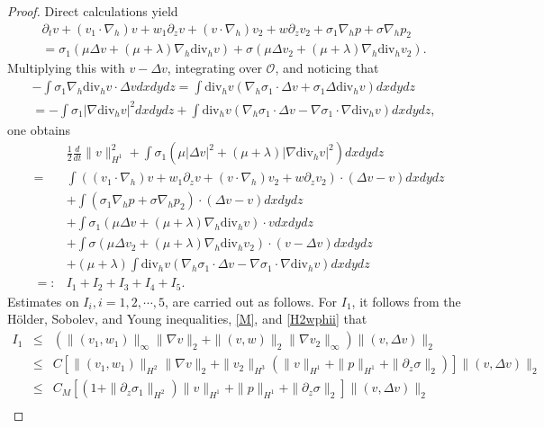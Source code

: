 \documentclass[12pt,reqno]{amsart}
\numberwithin{equation}{section}
\begin{document}
\begin{proof}
  Direct calculations yield
  \begin{align*}
    \partial_tv+(v_1\cdot\nabla_h)v+w_1\partial_zv+(v\cdot\nabla_h)v_2+w\partial_zv_2+\sigma_1\nabla_hp+\sigma\nabla_hp_2\\
    =\sigma_1(\mu\Delta v+(\mu+\lambda)\nabla_h\text{div}_hv)+\sigma(\mu\Delta v_2+(\mu+\lambda)\nabla_h\text{div}_hv_2).
  \end{align*}
  Multiplying this with $v-\Delta v$, integrating over $\mathcal O$, and noticing that
  \begin{eqnarray*}
    -\int\sigma_1\nabla_h\text{div}_hv\cdot\Delta vdxdydz
    =\int\text{div}_hv(\nabla_h\sigma_1\cdot\Delta v+\sigma_1\Delta\text{div}_hv)dxdydz\\
    =-\int\sigma_1|\nabla\text{div}_hv|^2dxdydz+\int\text{div}_hv(\nabla_h\sigma_1\cdot\Delta v-\nabla\sigma_1\cdot\nabla\text{div}_hv)
    dxdydz,
  \end{eqnarray*}
  one obtains
  \begin{eqnarray}
    &&\frac12\frac{d}{dt}\|v\|_{H^1}^2+\int\sigma_1(\mu|\Delta v|^2+(\mu+\lambda)|\nabla\text{div}_hv|^2)dxdydz\nonumber\\
    &=&\int((v_1\cdot\nabla_h)v+w_1\partial_zv+(v\cdot\nabla_h)v_2+w\partial_zv_2)\cdot(\Delta v-v)dxdydz\nonumber\\
    &&+\int(\sigma_1\nabla_hp+\sigma\nabla_hp_2)\cdot(\Delta v-v)dxdydz\nonumber\\
    &&+\int\sigma_1(\mu\Delta v+(\mu+\lambda)\nabla_h\text{div}_hv)\cdot vdxdydz\nonumber\\
    &&+\int\sigma(\mu\Delta v_2+(\mu+\lambda)\nabla_h\text{div}_hv_2)\cdot(v-\Delta v)dxdydz\nonumber\\
    &&+(\mu+\lambda)\int\text{div}_hv(\nabla_h\sigma_1\cdot\Delta v-\nabla\sigma_1\cdot\nabla\text{div}_hv)dxdydz\nonumber \\
    &=:&I_1+I_2+I_3+I_4+I_5. \label{922-5}
  \end{eqnarray}
  Estimates on $I_i, i=1,2,\cdots,5$, are carried out as follows. For $I_1$, it follows from the H\"older, Sobolev, and Young inequalities, \eqref{M}, and
  \eqref{H2wphii} that
  \begin{eqnarray*}
    I_1&\leq&(\|(v_1,w_1)\|_\infty\|\nabla v\|_2+\|(v,w)\|_2\|\nabla v_2\|_\infty)\|(v,\Delta v)\|_2\\
    &\leq&C[\|(v_1,w_1)\|_{H^2}\|\nabla v\|_2+\|v_2\|_{H^3}(\|v\|_{H^1}+\|p\|_{H^1}+\|\partial_z\sigma\|_2)]\|(v,\Delta v)\|_2\\
    &\leq&C_M[(1+\|\partial_z\sigma_1\|_{H^2})\|v\|_{H^1}+\|p\|_{H^1}+\|\partial_z\sigma\|_2]\|(v,\Delta v)\|_2\\

\end{eqnarray*}
\end{proof}
\end{document}
